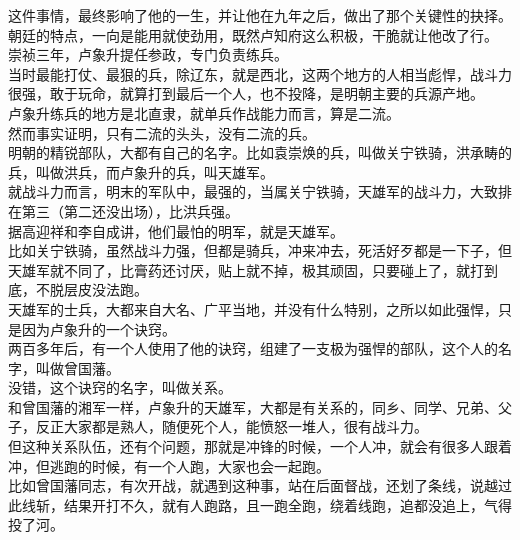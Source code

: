 \begin{multicols}{\theparacolNo}
这件事情，最终影响了他的一生，并让他在九年之后，做出了那个关键性的抉择。\\

朝廷的特点，一向是能用就使劲用，既然卢知府这么积极，干脆就让他改了行。\\

崇祯三年，卢象升提任参政，专门负责练兵。\\

当时最能打仗、最狠的兵，除辽东，就是西北，这两个地方的人相当彪悍，战斗力很强，敢于玩命，就算打到最后一个人，也不投降，是明朝主要的兵源产地。\\

卢象升练兵的地方是北直隶，就单兵作战能力而言，算是二流。\\

然而事实证明，只有二流的头头，没有二流的兵。\\

明朝的精锐部队，大都有自己的名字。比如袁崇焕的兵，叫做关宁铁骑，洪承畴的兵，叫做洪兵，而卢象升的兵，叫天雄军。\\

就战斗力而言，明末的军队中，最强的，当属关宁铁骑，天雄军的战斗力，大致排在第三（第二还没出场），比洪兵强。\\

据高迎祥和李自成讲，他们最怕的明军，就是天雄军。\\

比如关宁铁骑，虽然战斗力强，但都是骑兵，冲来冲去，死活好歹都是一下子，但天雄军就不同了，比膏药还讨厌，贴上就不掉，极其顽固，只要碰上了，就打到底，不脱层皮没法跑。\\

天雄军的士兵，大都来自大名、广平当地，并没有什么特别，之所以如此强悍，只是因为卢象升的一个诀窍。\\

两百多年后，有一个人使用了他的诀窍，组建了一支极为强悍的部队，这个人的名字，叫做曾国藩。\\

没错，这个诀窍的名字，叫做关系。\\

和曾国藩的湘军一样，卢象升的天雄军，大都是有关系的，同乡、同学、兄弟、父子，反正大家都是熟人，随便死个人，能愤怒一堆人，很有战斗力。\\

但这种关系队伍，还有个问题，那就是冲锋的时候，一个人冲，就会有很多人跟着冲，但逃跑的时候，有一个人跑，大家也会一起跑。\\

比如曾国藩同志，有次开战，就遇到这种事，站在后面督战，还划了条线，说越过此线斩，结果开打不久，就有人跑路，且一跑全跑，绕着线跑，追都没追上，气得投了河。\\


\end{multicols}

